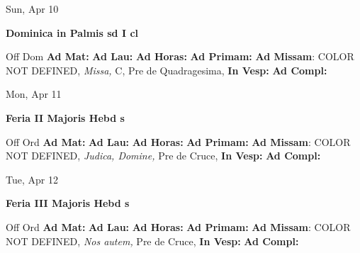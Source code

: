 \documentclass[10pt]{book}
\begin{document}
\begin{center}
\begin{minipage}{3.5in}
\vspace{2em}
\begin{center}Sun, Apr 10
\end{center}
\textbf{ \large Dominica in Palmis
\textnormal{\normalsize sd I cl}}

\begin{justify}Off Dom
\textbf{Ad Mat: }
\textbf{Ad Lau: }
\textbf{Ad Horas: }
\textbf{Ad Primam: }\textbf{Ad Missam}: COLOR NOT DEFINED, \textit{Missa,} C, Pre de Quadragesima, 
\textbf{In Vesp: }
\textbf{Ad Compl: }
\end{justify}
\end{minipage}
\end{center}

\begin{center}
\begin{minipage}{3.5in}
\vspace{2em}
\begin{center}Mon, Apr 11
\end{center}
\textbf{ \large Feria II Majoris Hebd
\textnormal{\normalsize s}}

\begin{justify}Off Ord
\textbf{Ad Mat: }
\textbf{Ad Lau: }
\textbf{Ad Horas: }
\textbf{Ad Primam: }\textbf{Ad Missam}: COLOR NOT DEFINED, \textit{Judica, Domine,} Pre de Cruce, 
\textbf{In Vesp: }
\textbf{Ad Compl: }
\end{justify}
\end{minipage}
\end{center}

\begin{center}
\begin{minipage}{3.5in}
\vspace{2em}
\begin{center}Tue, Apr 12
\end{center}
\textbf{ \large Feria III Majoris Hebd
\textnormal{\normalsize s}}

\begin{justify}Off Ord
\textbf{Ad Mat: }
\textbf{Ad Lau: }
\textbf{Ad Horas: }
\textbf{Ad Primam: }\textbf{Ad Missam}: COLOR NOT DEFINED, \textit{Nos autem,} Pre de Cruce, 
\textbf{In Vesp: }
\textbf{Ad Compl: }
\end{justify}
\end{minipage}
\end{center}
\end{document}
